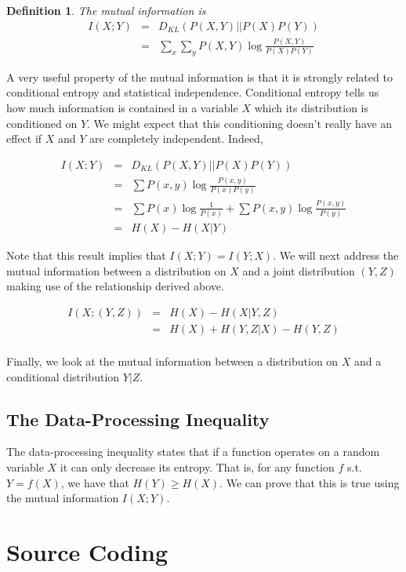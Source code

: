 \documentclass[a4paper,11pt]{book}
\newtheorem{definition}{Definition}
\begin{document}
\begin{definition}
The mutual information is 
\begin{eqnarray*}
I(X;Y) &=& D_{KL}(P(X,Y)||P(X)P(Y)) \\
&=& \sum_{x}\sum_{y} P(X,Y) \log \frac{P(X,Y)}{P(X)P(Y)}
\end{eqnarray*}
\end{definition}

A very useful property of the mutual information is that it is strongly related to conditional entropy and statistical independence. Conditional entropy tells us how much information is contained in a variable $X$ which its distribution is conditioned on $Y$. We might expect that this conditioning doesn't really have an effect if $X$ and $Y$ are completely independent. Indeed,

\begin{eqnarray*}
I(X;Y) &=& D_{KL}(P(X,Y)||P(X)P(Y)) \\
&=& \sum P(x,y) \log \frac{P(x,y)}{P(x)P(y)}\\
&=& \sum P(x)\log \frac{1}{P(x)} + \sum P(x,y)\log \frac{P(x,y)}{P(y)} \\
 &=& H(X) - H(X|Y)
\end{eqnarray*}

Note that this result implies that $I(X;Y) = I(Y;X)$. We will next address the mutual information between a distribution on $X$ and a joint distribution $(Y,Z)$ making use of the relationship derived above. 

\begin{eqnarray*}
I(X;(Y,Z)) &=& H(X) - H(X|Y,Z)\\
&=& H(X) + H(Y,Z|X) - H(Y,Z)\\
\end{eqnarray*}

Finally, we look at the mutual information between a distribution on $X$ and a conditional distribution $Y|Z$.

\subsection{The Data-Processing Inequality}

The data-processing inequality states that if a function operates on a random variable $X$ it can only decrease its entropy. That is, for any function $f$ s.t. $Y= f(X)$, we have that $H(Y) \geq H(X)$. We can prove that this is true using the mutual information $I(X;Y)$.

\section{Source Coding}
\end{document}
